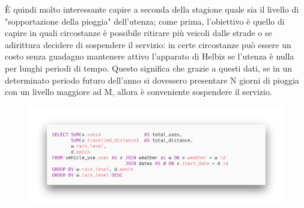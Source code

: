 È quindi molto interessante capire a seconda della stagione quale
sia il livello di "sopportazione della pioggia" dell'utenza; come prima,
l'obiettivo è quello di capire in quali circostanze è possibile ritirare
più veicoli dalle strade o se adirittura decidere di sospendere il servizio: in
certe circostanze può essere un costo senza guadagno mantenere attivo l'apparato
di Helbiz se l'utenza è nulla per lunghi periodi di tempo.
Questo significa che grazie a questi dati, se in un determinato periodo futuro
dell'anno si dovessero presentare N giorni di pioggia con un livello maggiore ad M,
allora è conveniente sospendere il servizio.
\begin{figure}[H]                                                                                                                                                            
\centering                                                                                                                                                                   
\includegraphics[width=\textwidth]{images/query2}                                                                                                                                   
\label{fig:query2}                                                                                                                                                           
\end{figure}

